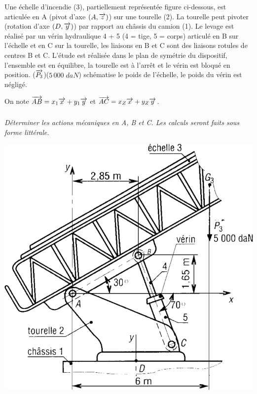 \documentclass[10pt]{article}
\begin{document}
\begin{minipage}[c]{.5\linewidth}
Une échelle d’incendie (3), partiellement représentée figure ci-dessous, est articulée en A (pivot d'axe $(A,\overrightarrow{z})$) sur une tourelle (2). La tourelle peut pivoter (rotation d'axe $(D,\overrightarrow{y})$) par rapport au châssis du camion (1). Le levage est réalisé par un vérin hydraulique 4 + 5 (4 = tige, 5 = corps) articulé en B sur l'échelle et en C sur la tourelle, les liaisons en B et C sont des liaisons rotules de centres B et C.
L'étude est réalisée dans le plan de symétrie du dispositif, l'ensemble est en équilibre, la tourelle est à l'arrêt et le vérin est bloqué en position. ($\overrightarrow{P_3}$)($5\,000\;daN$) schématise le poids de l'échelle, le poids du vérin est négligé.

On note $\overrightarrow{AB}=x_1 \overrightarrow{x} + y_1 \overrightarrow{y}$ et $\overrightarrow{AC}=x_Z \overrightarrow{x} + y_Z \overrightarrow{y}$.

\subparagraph*{}
\textit{Déterminer les actions mécaniques en A, B et C. Les calculs seront faits sous forme littérale.}


\end{minipage}\hfill
\begin{minipage}[c]{.48\linewidth}
\begin{center}
\includegraphics[width=\textwidth]{images/echelle}
\end{center}
\end{minipage}
\end{document}
